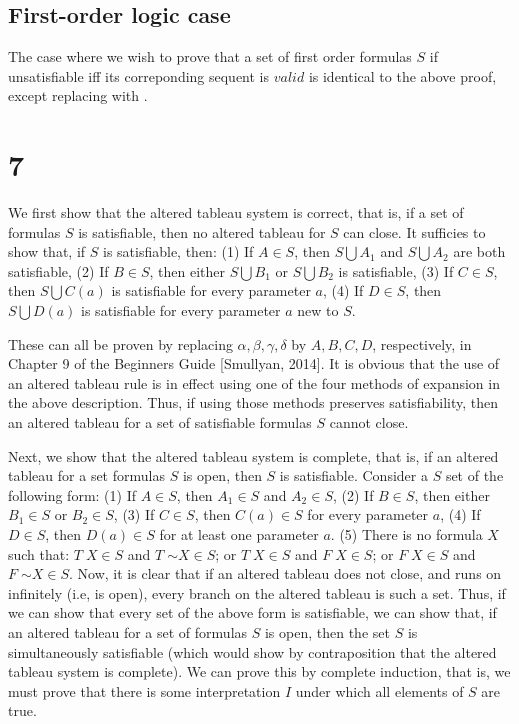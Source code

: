 \documentclass{article}
\newcommand*{\oldneg}{\mathord{\sim}}
\theoremstyle{definition}
\begin{document}
\subsection*{First-order logic case}
The case where we wish to prove that a set of first order formulas $S$ if unsatisfiable iff its correponding sequent is $valid$ is identical to the above 
proof, except replacing  with .

\section*{7}
We first show that the altered tableau system is correct, that is, if a set of formulas $S$ is satisfiable, then no altered tableau for $S$ can close. It sufficies to show that, if $S$ is 
satisfiable, then:\newline
(1) If $A\in S$, then $S\bigcup A_1$ and $S\bigcup A_2$ are both satisfiable,\newline
(2) If $B\in S$, then either $S\bigcup B_1$ or $S\bigcup B_2$ is satisfiable,\newline
(3) If $C\in S$, then $S\bigcup C(a)$ is satisfiable for every parameter $a$,\newline
(4) If $D\in S$, then $S\bigcup D(a)$ is satisfiable for every parameter $a$ new to $S$.\newline


These can all be proven by replacing $\alpha,\beta,\gamma,\delta$ by $A,B,C,D$, respectively, in Chapter 9 of the Beginners Guide [Smullyan, 2014]. It is obvious 
that the use of an altered tableau rule is in effect using one of the four methods of expansion in the above description. Thus, if using those methods preserves 
satisfiability, then an altered tableau for a set of satisfiable formulas $S$ cannot close.


Next, we show that the altered tableau system is complete, that is, if an altered tableau for a set formulas $S$ is open, then $S$ is satisfiable. Consider a $S$ set of the following form:\newline
(1) If $A\in S$, then $A_1\in S$ and $A_2\in S$,\newline
(2) If $B\in S$, then either $B_1\in S$ or $B_2\in S$,\newline
(3) If $C\in S$, then $C(a)\in S$ for every parameter $a$,\newline
(4) If $D\in S$, then $D(a)\in S$ for at least one parameter $a$.\newline
(5) There is no formula $X$ such that: $T\; X\in S$ and $T\;\oldneg X\in S$; or $T\; X\in S$ and $F\; X\in S$; or $F\; X\in S$ and $F\;\oldneg X\in S$.\newline
Now, it is clear that if an altered tableau does not close, and runs on infinitely (i.e, is open), every branch on the altered tableau is such a set. Thus, if we can show that every set of 
the above form is satisfiable, we can show that, if an altered tableau for a set of formulas $S$ is open, then the set $S$ is simultaneously satisfiable (which would show by contraposition 
that the altered tableau system is complete). We can prove this by complete induction, that is, we must prove that there is some interpretation $I$ under which all elements of $S$ are true.
\end{document}
